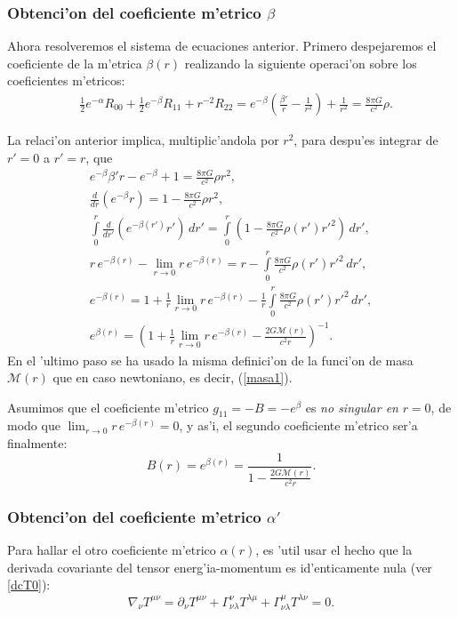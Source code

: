 \subsubsection{Obtenci'on del coeficiente m'etrico \texorpdfstring{$\beta$}{B}}
Ahora resolveremos el sistema de ecuaciones anterior. Primero despejaremos el coeficiente de la m'etrica $\beta(r)$ realizando la siguiente operaci'on sobre los coeficientes m'etricos:
\begin{align}
 &\frac{1}{2}e^{-\alpha}R_{00}+\frac{1}{2}e^{-\beta}R_{11}+r^{-2}R_{22}=e^{-\beta}\left(\frac{\beta'}{r}-\frac{1}{r^2}\right)+\frac{1}{r^2}=\frac{8\pi G}{c^2}\rho.
\end{align}

La relaci'on anterior implica, multiplic'andola por $r^2$, para despu'es integrar de $r'=0$ a $r'=r$, que
\begin{gather}
e^{-\beta}\beta' r-e^{-\beta}+1=\frac{8\pi G}{c^2}\rho r^2,\\
 \frac{d}{dr}\left( e^{-\beta}r\right) =1-\frac{8\pi G}{c^2}\rho r^2,\\
 \int\limits_{0}^r\frac{d}{dr'}\left( e^{-\beta(r')}r'\right)\,dr' =\int\limits_{0}^r \left(1-\frac{8\pi G}{c^2}\rho(r') r'^2\right)\,dr',\\
 r\,e^{-\beta(r)}-\lim_{r\to0}r\,e^{-\beta(r)}=r-\int\limits_{0}^r \frac{8\pi G}{c^2}\rho(r') r'^2\,dr',\\
e^{-\beta(r)}=1+\frac{1}{r}\lim_{r\to0}r\,e^{-\beta(r)}-\frac{1}{r}\int\limits_{0}^r \frac{8\pi G}{c^2}\rho(r') r'^2\,dr',\\
e^{\beta(r)}=\left(1+\frac{1}{r}\lim_{r\to0}r\,e^{-\beta(r)}-\frac{2G\mathcal{M}(r)}{c^2r}\right)^{-1}.
\end{gather}
En el 'ultimo paso se ha usado la misma definici'on de la funci'on de masa $\mathcal{M}(r)$ que en caso newtoniano, es decir,  (\ref{masa1}).

Asumimos que el coeficiente m'etrico $g_{11}=-B=-e^{\beta}$ es \textit{no singular en} $r=0$, de modo que $\lim_{r\to0}r\,e^{-\beta(r)}=0$, y as'i, el segundo coeficiente m'etrico ser'a finalmente:
\begin{equation}\label{beta}
\boxed{B(r)=e^{\beta(r)}=\dfrac{1}{1-\frac{2G\mathcal{M}(r)}{c^2r}}.}
\end{equation}

\subsubsection{Obtenci'on del coeficiente m'etrico \texorpdfstring{$\alpha'$}{'a}}
Para hallar el otro coeficiente m'etrico $\alpha(r)$, es 'util usar el hecho que la derivada covariante del tensor energ'ia-momentum es id'enticamente nula (ver \eqref{dcT0}):
\begin{equation}\label{cons}
 \nabla_{\nu}T^{\mu\nu}=\partial_{\nu}T^{\mu\nu}+\Gamma^{\nu}_{\nu\lambda}T^{\lambda\mu}+\Gamma^{\mu}_{\nu\lambda}T^{\lambda\nu}=0.
\end{equation}

